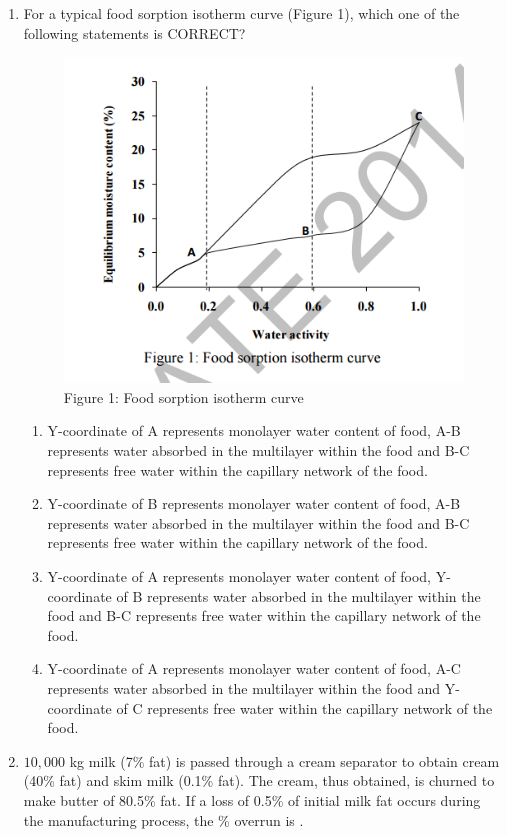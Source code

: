 \documentclass[a4paper,10pt]{article}
\begin{document}
\begin{enumerate}
    \item For a typical food sorption isotherm curve (Figure 1), which one of the following statements is CORRECT?
    \begin{figure}[H] \centering \includegraphics[width=0.6\columnwidth]{q20_food.png} \caption*{Figure 1: Food sorption isotherm curve} \label{fig:q20_food} \end{figure}
    
    \hfill{}
    \begin{enumerate}
        \item Y-coordinate of A represents monolayer water content of food, A-B represents water absorbed in the multilayer within the food and B-C represents free water within the capillary network of the food.
        \item Y-coordinate of B represents monolayer water content of food, A-B represents water absorbed in the multilayer within the food and B-C represents free water within the capillary network of the food.
        \item Y-coordinate of A represents monolayer water content of food, Y-coordinate of B represents water absorbed in the multilayer within the food and B-C represents free water within the capillary network of the food.
        \item Y-coordinate of A represents monolayer water content of food, A-C represents water absorbed in the multilayer within the food and Y-coordinate of C represents free water within the capillary network of the food.
    \end{enumerate}
    
    \item $10,000$ kg milk (7\% fat) is passed through a cream separator to obtain cream (40\% fat) and skim milk (0.1\% fat). The cream, thus obtained, is churned to make butter of 80.5\% fat. If a loss of 0.5\% of initial milk fat occurs during the manufacturing process, the \% overrun is \underline{\hspace{2cm}}.
    

\end{enumerate}
\end{document}
